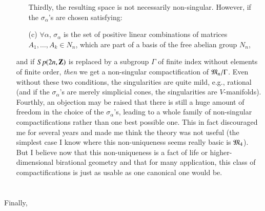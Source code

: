 \begin{itemize}
\begin{itemize}
Thirdly, the resulting space is not necessarily non-singular. However, if the $\sigma_\alpha$'s are chosen satisfying:

\item[(c)] $\forall \alpha$, $\sigma_\alpha$ is the set of positive linear combinations of matrices $A_1, \ldots, A_k \in N_n$, which are part of a basis of the free abelian group $N_n$,
\end{itemize}
and if $Sp(2n, \mathbf{Z})$ is replaced by a subgroup $\Gamma$ of finite index without elements of finite order, \textit{then} we get a non-singular compactification of $\mathfrak{M}_n/ \Gamma$. Even without these two conditions, the singularities are quite mild, e.g., rational (and if the $\sigma_\alpha$'s are merely simplicial cones, the singularities are $V$-manifolds). Fourthly, an objection may be raised that there is still a huge amount of freedom in the choice of the $\sigma_\alpha$'s, leading to a whole family of non-singular compactifications rather than one best possible one. This in fact discouraged me for several years and made me think the theory was not useful (the simplest case I know where this non-uniqueness seems really basic is $\mathfrak{M}_4$). But I believe now that this non-uniqueness is a fact of life or higher-dimensional birational geometry and that for many application, this class of compactifications is just as usable as one canonical one would be.
\end{itemize}

\section{}\label{art8-sec3}
Finally,\pageoriginale
 

